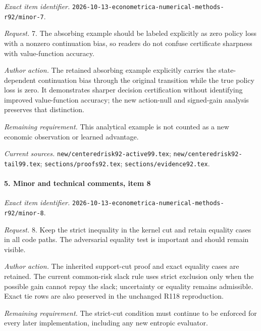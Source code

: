 \emph{Exact item identifier.} \nolinkurl{2026-10-13-econometrica-numerical-methods-r92/minor-7}.

\par\emph{Request.} 7. The absorbing example should be labeled explicitly as zero policy loss with a nonzero continuation bias, so readers do not confuse certificate sharpness with value-function accuracy.

\par\emph{Author action.} The retained absorbing example explicitly carries the state-dependent continuation bias through the original transition while the true policy loss is zero. It demonstrates sharper decision certification without identifying improved value-function accuracy; the new action-null and signed-gain analysis preserves that distinction.

\par\emph{Remaining requirement.} This analytical example is not counted as a new economic observation or learned advantage.

\par\emph{Current sources.} \nolinkurl{new/centeredrisk92-active99.tex}; \nolinkurl{new/centeredrisk92-tail99.tex}; \nolinkurl{sections/proofs92.tex}; \nolinkurl{sections/evidence92.tex}.

\paragraph{5. Minor and technical comments, item 8}

\emph{Exact item identifier.} \nolinkurl{2026-10-13-econometrica-numerical-methods-r92/minor-8}.

\par\emph{Request.} 8. Keep the strict inequality in the kernel cut and retain equality cases in all code paths. The adversarial equality test is important and should remain visible.

\par\emph{Author action.} The inherited support-cut proof and exact equality cases are retained. The current common-risk slack rule uses strict exclusion only when the possible gain cannot repay the slack; uncertainty or equality remains admissible. Exact tie rows are also preserved in the unchanged R118 reproduction.

\par\emph{Remaining requirement.} The strict-cut condition must continue to be enforced for every later implementation, including any new entropic evaluator.

